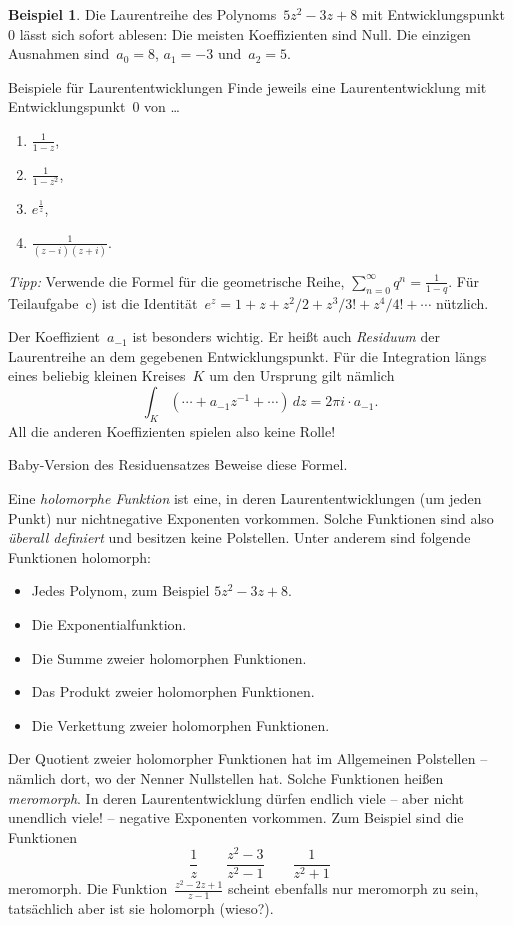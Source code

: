 \documentclass[twoside]{../zirkelblatt1415}
\theoremstyle{definition}
\newtheorem{bsp}[defn]{Beispiel}
\theoremstyle{plain}
\theoremstyle{remark}
\begin{document}
\begin{bsp}Die Laurentreihe des Polynoms~$5 z^2 - 3z + 8$ mit
Entwicklungspunkt~$0$ lässt sich sofort ablesen: Die meisten Koeffizienten sind
Null. Die einzigen Ausnahmen sind~$a_0 = 8$, $a_1 = -3$ und~$a_2 = 5$.\end{bsp}

\begin{aufgabe}{Beispiele für Laurententwicklungen}
Finde jeweils eine Laurententwicklung mit Entwicklungspunkt~$0$ von \ldots
\begin{enumerate}
\item $\frac{1}{1 - z}$,
\item $\frac{1}{1 - z^2}$,
\item $e^{\frac{1}{z}}$,
\item $\frac{1}{(z - i) (z + i)}$.
\end{enumerate}
\emph{Tipp:} Verwende die Formel für die geometrische Reihe, $\sum_{n=0}^\infty
q^n = \frac{1}{1 - q}$. Für Teilaufgabe~c) ist die Identität~$e^z = 1 + z + z^2/2 +
z^3/3! + z^4/4! + \cdots$ nützlich.
\end{aufgabe}

Der Koeffizient~$a_{-1}$ ist besonders wichtig. Er heißt auch \emph{Residuum}
der Laurentreihe an dem gegebenen Entwicklungspunkt. Für die Integration längs
eines beliebig kleinen Kreises~$K$ um den Ursprung gilt nämlich
\[ \int_K (\cdots + a_{-1} z^{-1} + \cdots) \,dz = 2\pi i \cdot a_{-1}. \]
All die anderen Koeffizienten spielen also keine Rolle!

\begin{aufgabe}{Baby-Version des Residuensatzes}\label{aufg:residuensatz-baby}
Beweise diese Formel.
\end{aufgabe}

Eine \emph{holomorphe Funktion} ist eine, in deren Laurententwicklungen (um
jeden Punkt) nur nichtnegative Exponenten vorkommen. Solche Funktionen sind
also \emph{überall definiert} und besitzen keine Polstellen. Unter anderem sind
folgende Funktionen holomorph:
\begin{itemize}
\item Jedes Polynom, zum Beispiel $5z^2 - 3z + 8$.
\item Die Exponentialfunktion.
\item Die Summe zweier holomorphen Funktionen.
\item Das Produkt zweier holomorphen Funktionen.
\item Die Verkettung zweier holomorphen Funktionen.
\end{itemize}
Der Quotient zweier holomorpher Funktionen hat im Allgemeinen Polstellen
-- nämlich dort, wo der Nenner Nullstellen hat. Solche Funktionen heißen
\emph{meromorph}. In deren Laurententwicklung dürfen endlich viele -- aber
nicht unendlich viele! -- negative Exponenten vorkommen. Zum Beispiel sind die
Funktionen
\[ \frac{1}{z} \qquad \frac{z^2 - 3}{z^2 - 1} \qquad \frac{1}{z^2 + 1} \]
meromorph. Die Funktion~$\frac{z^2 - 2z + 1}{z - 1}$ scheint ebenfalls nur
meromorph zu sein, tatsächlich aber ist sie holomorph (wieso?).
\end{document}
